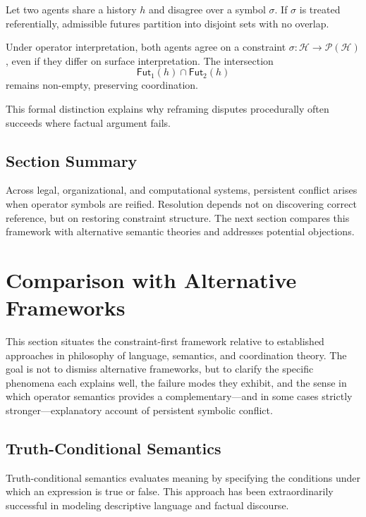 \documentclass[11pt]{article}
\newcommand{\Hist}{\mathcal{H}}
\begin{document}
Let two agents share a history $h$ and disagree over a symbol $\sigma$. If
$\sigma$ is treated referentially, admissible futures partition into disjoint
sets with no overlap.

Under operator interpretation, both agents agree on a constraint
$\sigma : \Hist \to \mathcal{P}(\Hist)$, even if they differ on surface
interpretation. The intersection
\[
\mathsf{Fut}_1(h) \cap \mathsf{Fut}_2(h)
\]
remains non-empty, preserving coordination.

This formal distinction explains why reframing disputes procedurally often
succeeds where factual argument fails.

\subsection{Section Summary}

Across legal, organizational, and computational systems, persistent conflict
arises when operator symbols are reified. Resolution depends not on discovering
correct reference, but on restoring constraint structure. The next section
compares this framework with alternative semantic theories and addresses
potential objections.

\section{Comparison with Alternative Frameworks}

This section situates the constraint-first framework relative to established
approaches in philosophy of language, semantics, and coordination theory. The
goal is not to dismiss alternative frameworks, but to clarify the specific
phenomena each explains well, the failure modes they exhibit, and the sense in
which operator semantics provides a complementary—and in some cases strictly
stronger—explanatory account of persistent symbolic conflict.

\subsection{Truth-Conditional Semantics}

Truth-conditional semantics evaluates meaning by specifying the conditions under
which an expression is true or false. This approach has been extraordinarily
successful in modeling descriptive language and factual discourse.
\end{document}
